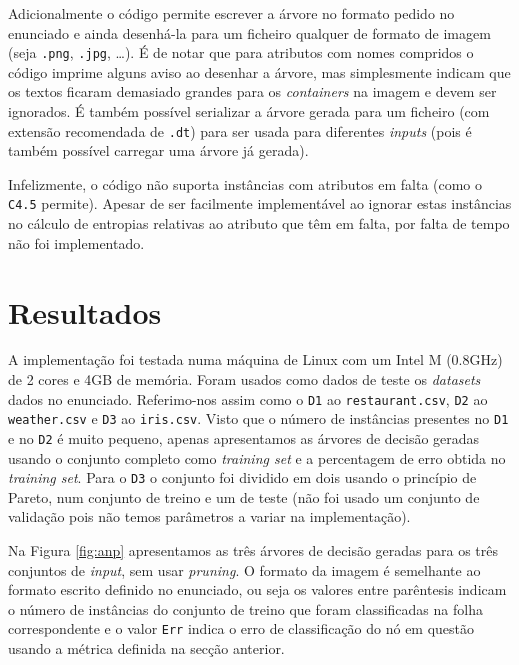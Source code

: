 \documentclass[12pt,a4paper,oneside]{article}
\begin{document}
Adicionalmente o código permite escrever a árvore no formato pedido no
enunciado e ainda desenhá-la para um ficheiro qualquer de formato de
imagem (seja \texttt{.png}, \texttt{.jpg}, \ldots). É de notar que
para atributos com nomes compridos o código imprime alguns aviso ao
desenhar a árvore, mas simplesmente indicam que os textos ficaram
demasiado grandes para os \textit{containers} na imagem e devem ser
ignorados. É também possível serializar a árvore gerada para um
ficheiro (com extensão recomendada de \texttt{.dt}) para ser usada
para diferentes \textit{inputs} (pois é também possível carregar uma
árvore já gerada).

Infelizmente, o código não suporta instâncias com atributos em falta
(como o \texttt{C4.5} permite). Apesar de ser facilmente implementável
ao ignorar estas instâncias no cálculo de entropias relativas ao
atributo que têm em falta, por falta de tempo não foi implementado.


\section{Resultados}
\label{sec:res}

A implementação foi testada numa máquina de Linux com um Intel M
(0.8GHz) de 2 cores e 4GB de memória. Foram usados como dados de teste
os \textit{datasets} dados no enunciado. Referimo-nos assim como o
\texttt{D1} ao \texttt{restaurant.csv}, \texttt{D2} ao
\texttt{weather.csv} e \texttt{D3} ao \texttt{iris.csv}. Visto que o
número de instâncias presentes no \texttt{D1} e no \texttt{D2} é muito
pequeno, apenas apresentamos as árvores de decisão geradas usando o
conjunto completo como \textit{training set} e a percentagem de erro
obtida no \textit{training set}. Para o \texttt{D3} o conjunto foi
dividido em dois usando o princípio de Pareto, num conjunto de treino
e um de teste (não foi usado um conjunto de validação pois não temos
parâmetros a variar na implementação).

Na Figura \ref{fig:anp} apresentamos as três árvores de decisão
geradas para os três conjuntos de \textit{input}, sem usar
\textit{pruning}. O formato da imagem é semelhante ao formato escrito
definido no enunciado, ou seja os valores entre parêntesis indicam o
número de instâncias do conjunto de treino que foram classificadas na
folha correspondente e o valor \texttt{Err} indica o erro de
classificação do nó em questão usando a métrica definida na secção
anterior.
\end{document}
